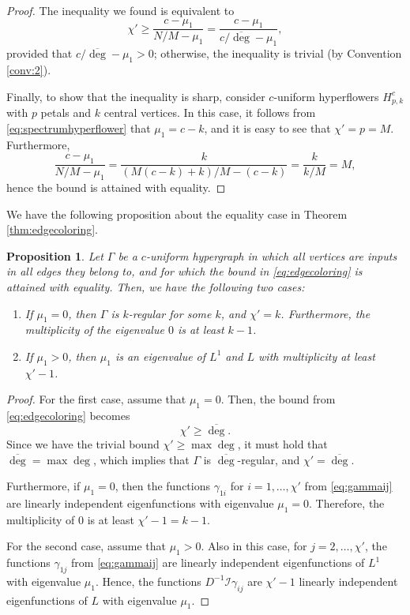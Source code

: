 \documentclass{article}
\theoremstyle{plain}
\newtheorem{proposition}[theorem]{Proposition}
\theoremstyle{definition}
\theoremstyle{remark}
\begin{document}
\begin{proof}
    The inequality we found is equivalent to
    \[
    \chi'\geq \frac{c-\mu_1}{N/M-\mu_1} = \frac{c-\mu_1}{c/\overline{\deg}-\mu_1},
    \]
    provided that $c/\overline{\deg}-\mu_1>0$; otherwise, the inequality is trivial (by Convention \ref{conv:2}).

    Finally, to show that the inequality is sharp, consider $c$-uniform hyperflowers $H_{p,k}^c$ with $p$ petals and $k$ central vertices. In this case, it follows from \eqref{eq:spectrumhyperflower} that $\mu_1=c-k$, and it is easy to see that $\chi' = p=M$. Furthermore,
    \[
    \frac{c-\mu_1}{N/M-\mu_1} = \frac{k}{(M(c-k)+k)/M-(c-k)} = \frac{k}{k/M} = M,
    \]
    hence the bound is attained with equality.
\end{proof}
We have the following proposition about the equality case in Theorem \ref{thm:edgecoloring}. 
\begin{proposition}\label{prop:edgecoloring}
    Let $\Gamma$ be a $c$-uniform hypergraph in which all vertices are inputs in all edges they belong to, and for which the bound in \eqref{eq:edgecoloring} is attained with equality. Then, we have the following two cases:
    \begin{enumerate}
        \item If $\mu_1=0$, then $\Gamma$ is $k$-regular for some $k$, and $\chi' = k$. Furthermore, the multiplicity of the eigenvalue $0$ is at least $k-1$.
        \item If $\mu_1>0$, then $\mu_1$ is an eigenvalue of $L^1$ and $L$ with multiplicity at least $\chi'-1$.
    \end{enumerate}
\end{proposition}
\begin{proof}
    For the first case, assume that $\mu_1=0$. Then, the bound from \eqref{eq:edgecoloring} becomes
    \[
    \chi'\geq \overline{\deg}.
    \]
    Since we have the trivial bound $\chi'\geq \max\deg$, it must hold that $\overline \deg = \max\deg$, which implies that $\Gamma$ is $\overline \deg$-regular, and $\chi' = \overline{\deg}$.

    Furthermore, if $\mu_1=0$, then the functions $\gamma_{1i}$ for $i=1,\ldots,\chi'$ from \eqref{eq:gammaij} are linearly independent eigenfunctions with eigenvalue $\mu_1=0$. Therefore, the multiplicity of $0$ is at least $\chi'-1=k-1$.

    For the second case, assume that $\mu_1>0$. Also in this case, for $j=2,\ldots,\chi'$, the functions $\gamma_{1j}$ from \eqref{eq:gammaij} are linearly independent eigenfunctions of $L^1$ with eigenvalue $\mu_1$. Hence, the functions $D^{-1}\mathcal I\gamma_{ij}$ are $\chi'-1$ linearly independent eigenfunctions of $L$ with eigenvalue $\mu_1$.
\end{proof}
\end{document}
